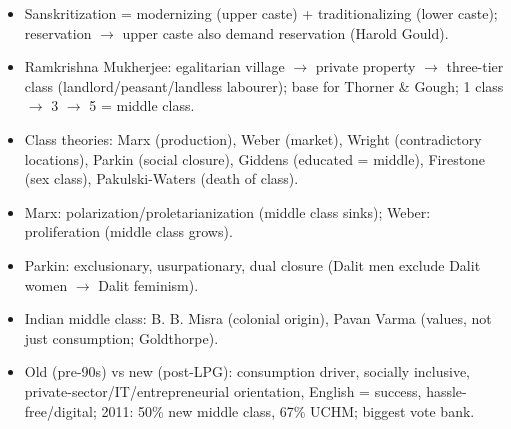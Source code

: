 \begin{QuickRevision}
\begin{itemize}
\item Sanskritization = modernizing (upper caste) + traditionalizing (lower caste); reservation $\rightarrow$ upper caste also demand reservation (Harold Gould).
\item Ramkrishna Mukherjee: egalitarian village $\rightarrow$ private property $\rightarrow$ three-tier class (landlord/peasant/landless labourer); base for Thorner \& Gough; 1 class $\rightarrow$ 3 $\rightarrow$ 5 = middle class.
\item Class theories: Marx (production), Weber (market), Wright (contradictory locations), Parkin (social closure), Giddens (educated = middle), Firestone (sex class), Pakulski-Waters (death of class).
\item Marx: polarization/proletarianization (middle class sinks); Weber: proliferation (middle class grows).
\item Parkin: exclusionary, usurpationary, dual closure (Dalit men exclude Dalit women $\rightarrow$ Dalit feminism).
\item Indian middle class: B. B. Misra (colonial origin), Pavan Varma (values, not just consumption; Goldthorpe).
\item Old (pre-90s) vs new (post-LPG): consumption driver, socially inclusive, private-sector/IT/entrepreneurial orientation, English = success, hassle-free/digital; 2011: 50\% new middle class, 67\% UCHM; biggest vote bank.
\end{itemize}
\end{QuickRevision}

